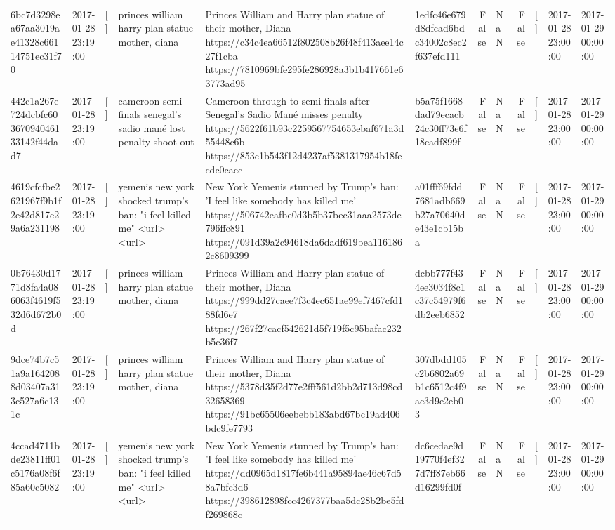 \begin{tabular}{llllllrlrlll}
6bc7d3298ea67aa3019ae41328c66114751ec31f70 & 2017-01-28 23:19:00 & [] & princes william harry plan statue mother, diana & Princes William and Harry plan statue of their mother, Diana https://c34c4ea66512f802508b26f48f413aee14c27f1cba https://7810969bfe295fe286928a3b1b417661e63773ad95 & 1edfc46e679d8dfcad6bdc34002c8ec2f637efd111 & False & NaN & False & [] & 2017-01-28 23:00:00 & 2017-01-29 00:00:00 \\
442c1a267e724dcbfc60367094046133142f44dad7 & 2017-01-28 23:19:00 & [] & cameroon semi-finals senegal's sadio mané lost penalty shoot-out & Cameroon through to semi-finals after Senegal’s Sadio Mané misses penalty https://5622f61b93c2259567754653ebaf671a3d55448c6b https://853c1b543f12d4237af5381317954b18fecdc0cacc & b5a75f1668dad79ecacb24c30ff73e6f18cadf899f & False & NaN & False & [] & 2017-01-28 23:00:00 & 2017-01-29 00:00:00 \\
4619cfcfbe2621967f9b1f2e42d817e29a6a231198 & 2017-01-28 23:19:00 & [] & yemenis new york shocked trump's ban: "i feel killed me" <url> <url> & New York Yemenis stunned by Trump's ban: 'I feel like somebody has killed me' https://506742eafbe0d3b5b37bec31aaa2573de796ffc891 https://091d39a2c94618da6dadf619bea1161862c8609399 & a01fff69fdd7681adb669b27a70640de43e1cb15ba & False & NaN & False & [] & 2017-01-28 23:00:00 & 2017-01-29 00:00:00 \\
0b76430d1771d8fa4a086063f4619f532d6d672b0d & 2017-01-28 23:19:00 & [] & princes william harry plan statue mother, diana & Princes William and Harry plan statue of their mother, Diana https://999dd27caee7f3c4ec651ae99ef7467cfd188fd6e7 https://267f27cacf542621d5f719f5c95bafac232b5c36f7 & dcbb777f434ee3034f8c1c37c54979f6db2eeb6852 & False & NaN & False & [] & 2017-01-28 23:00:00 & 2017-01-29 00:00:00 \\
9dce74b7c51a9a1642088d03407a313c527a6c131c & 2017-01-28 23:19:00 & [] & princes william harry plan statue mother, diana & Princes William and Harry plan statue of their mother, Diana https://5378d35f2d77e2fff561d2bb2d713d98cd32658369 https://91bc65506eebebb183abd67bc19ad406bdc9fe7793 & 307dbdd105c2b6802a69b1c6512c4f9ac3d9e2eb03 & False & NaN & False & [] & 2017-01-28 23:00:00 & 2017-01-29 00:00:00 \\
4ccad4711bde23811ff01c5176a08f6f85a60c5082 & 2017-01-28 23:19:00 & [] & yemenis new york shocked trump's ban: "i feel killed me" <url> <url> & New York Yemenis stunned by Trump's ban: 'I feel like somebody has killed me' https://dd0965d1817fe6b441a95894ae46c67d58a7bfc3d6 https://398612898fcc4267377baa5dc28b2be5fdf269868c & dc6cedae9d19770f4ef327d7ff87eb66d16299fd0f & False & NaN & False & [] & 2017-01-28 23:00:00 & 2017-01-29 00:00:00 \\

\end{tabular}
